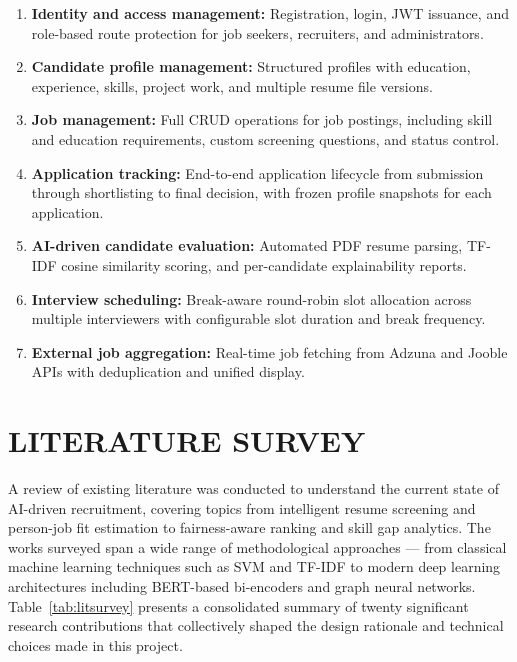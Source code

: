 \documentclass[12pt,a4paper]{report}
\begin{document}
\begin{enumerate}[leftmargin=0.5in, label=\arabic*., topsep=4pt, itemsep=3pt]
    \item \textbf{Identity and access management:} Registration, login, JWT issuance, and role-based route protection for job seekers, recruiters, and administrators.
    \item \textbf{Candidate profile management:} Structured profiles with education, experience, skills, project work, and multiple resume file versions.
    \item \textbf{Job management:} Full CRUD operations for job postings, including skill and education requirements, custom screening questions, and status control.
    \item \textbf{Application tracking:} End-to-end application lifecycle from submission through shortlisting to final decision, with frozen profile snapshots for each application.
    \item \textbf{AI-driven candidate evaluation:} Automated PDF resume parsing, TF-IDF cosine similarity scoring, and per-candidate explainability reports.
    \item \textbf{Interview scheduling:} Break-aware round-robin slot allocation across multiple interviewers with configurable slot duration and break frequency.
    \item \textbf{External job aggregation:} Real-time job fetching from Adzuna and Jooble APIs with deduplication and unified display.
\end{enumerate}

\chapter{LITERATURE SURVEY}

A review of existing literature was conducted to understand the current state of AI-driven recruitment, covering topics from intelligent resume screening and person-job fit estimation to fairness-aware ranking and skill gap analytics. The works surveyed span a wide range of methodological approaches — from classical machine learning techniques such as SVM and TF-IDF to modern deep learning architectures including BERT-based bi-encoders and graph neural networks. Table~\ref{tab:litsurvey} presents a consolidated summary of twenty significant research contributions that collectively shaped the design rationale and technical choices made in this project.
\end{document}
